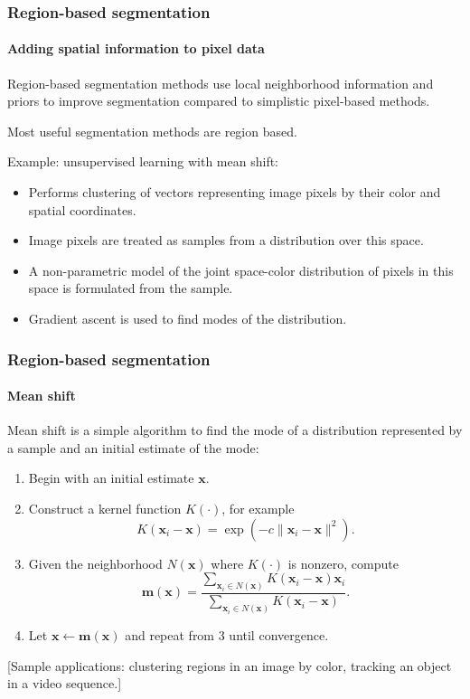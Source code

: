 \documentclass[aspectratio=169]{beamer}
\renewcommand{\vec}[1]{\boldsymbol{#1}}
\begin{document}
\begin{frame}
\frametitle{Region-based segmentation}
\framesubtitle{Adding spatial information to pixel data}

Region-based segmentation methods use \alert{local neighborhood}
information and \alert{priors} to improve segmentation compared to
simplistic pixel-based methods.

\medskip

Most useful segmentation methods are region based.

\medskip

Example: unsupervised learning with \alert{mean shift}:
\begin{itemize}
\item Performs clustering of vectors representing image pixels by
  their color and spatial coordinates.
\item Image pixels are treated as samples from a distribution over
  this space.
\item A non-parametric model of the joint space-color distribution of
  pixels in this space is formulated from the sample.
\item Gradient ascent is used to find modes of the distribution.
\end{itemize}

\end{frame}


\begin{frame}
\frametitle{Region-based segmentation}
\framesubtitle{Mean shift}

Mean shift is a simple algorithm to find the mode of a distribution
represented by a sample and an initial estimate of the mode:
\begin{enumerate}
\item Begin with an initial estimate $\vec{x}$.
\item Construct a \alert{kernel} function $K(\cdot)$, for example
  \[K(\vec{x}_i-\vec{x}) = \exp(-c\|\vec{x}_i-\vec{x}\|^2).\]
\item Given the neighborhood $N(\vec{x})$ where $K(\cdot)$ is nonzero,
    compute
   \[\vec{m}(\vec{x}) = \frac{
    \sum_{\vec{x}_i \in N(\vec{x})} K(\vec{x}_i-\vec{x}) \vec{x}_i}{
    \sum_{\vec{x}_i \in N(\vec{x})} K(\vec{x}_i-\vec{x})}. \]
\item Let $\vec{x} \leftarrow \vec{m}(\vec{x})$ and repeat from 3
    until convergence.
\end{enumerate}

[Sample applications: clustering regions in an image by color,
tracking an object in a video sequence.]

\end{frame}
\end{document}
